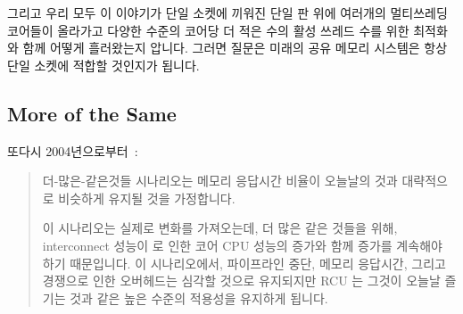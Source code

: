 그리고 우리 모두 이 이야기가 단일 소켓에 끼워진 단일 판 위에 여러개의
멀티쓰레딩 코어들이 올라가고 다양한 수준의 코어당 더 적은 수의 활성 쓰레드 수를
위한 최적화와 함께 어떻게 흘러왔는지 압니다.
그러면 질문은 미래의 공유 메모리 시스템은 항상 단일 소켓에 적합할 것인지가
됩니다.

\subsection{More of the Same}
\label{sec:meas:More of the Same}

또다시 2004년으로부터~\cite{PaulEdwardMcKenneyPhD}:

\begin{quote}
	더-많은-같은것들 시나리오는 메모리 응답시간 비율이 오늘날의 것과
	대략적으로 비슷하게 유지될 것을 가정합니다.

	이 시나리오는 실제로 변화를 가져오는데, 더 많은 같은 것들을 위해,
	interconnect 성능이  로 인한 코어 CPU
	성능의 증가와 함께 증가를 계속해야 하기 때문입니다.
	이 시나리오에서, 파이프라인 중단, 메모리 응답시간, 그리고 경쟁으로 인한
	오버헤드는 심각할 것으로 유지되지만 RCU 는 그것이 오늘날 즐기는 것과
	같은 높은 수준의 적용성을 유지하게 됩니다.

\end{quote}

